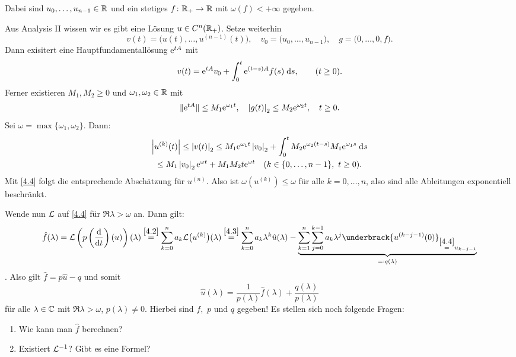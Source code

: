 \documentclass[a4paper,twoside,DIV15,BCOR12mm]{scrbook}
\begin{document}
Dabei sind $u_0,\dotsc,u_{n-1}\in\mathbb{R}$ und ein stetiges $f\colon\mathbb{R}_+\to\mathbb{R}$ mit $\omega(f)<+\infty$ gegeben.

Aus Analysis II wissen wir es gibt eine Lösung $u\in C^n(\mathbb{R}_+)$. Setze weiterhin
\[v(t)=\bigl(u(t),\dotsc,u^{(n-1)}(t)\bigr),\quad v_0=\bigl(u_0,\dotsc,u_{n-1}\bigr),\quad g=\bigl(0,\dotsc,0,f\bigr).\]
Dann exisitert eine Hauptfundamentallösung $\mathrm{e}^{tA}$ mit
\[v(t) = \mathrm{e}^{tA}v_0+\int_{0}^{t}{\mathrm{e}^{(t-s)A}f(s)}\;\mathrm{d} s,\qquad(t\geq0).\]
Ferner existieren $M_1,M_2\geq 0$ und $\omega_1,\omega_2\in\mathbb{R}$ mit
\[\|\mathrm{e}^{tA}\|\leq M_1\mathrm{e}^{\omega_1 t},\quad\left\lvert g(t)\right\lvert_2\leq M_2\mathrm{e}^{\omega_2t},\quad t\geq0.\]
Sei $\omega = \max\{\omega_1,\omega_2\}$. Dann:
\begin{multline*}
\left\lvert u^{(k)}(t)\right\lvert\leq\left\lvert v(t)\right\lvert_2\leq M_1\mathrm{e}^{\omega_1t}\left\lvert v_0\right\lvert_2+\int_{0}^{t}{M_2\mathrm{e}^{\omega_2(t-s)}M_1\mathrm{e}^{\omega_1s}}\;\mathrm{d} s\\
\leq M_1\left\lvert v_0\right\lvert_2\mathrm{e}^{\omega t}+M_1M_2t\mathrm{e}^{\omega t}\quad(k\in\{0,\dotsc,n-1\},\ t\geq0).
\end{multline*}
Mit \eqref{4.4} folgt die entsprechende Abschätzung für $u^{(n)}$. Also ist $\omega(u^{(k)})\leq\omega$ für alle $k=0,\dotsc,n$, also sind alle Ableitungen exponentiell beschränkt.

Wende nun $\mathcal{L}$ auf \eqref{4.4} für $\Re{\lambda}>\omega$ an. Dann gilt:
\[\hat{f}(\lambda) = \L\left(p\left(\frac{\d}{\d t}\right)(u)\right)(\lambda)\overset{\eqref{4.2}}{=}\sum_{k=0}^na_k\L\bigl(u^{(k)}\bigr)(\lambda)
\overset{\eqref{4.3}}{=} \sum_{k=0}^na_k\lambda^k\hat{u}(\lambda) - \underbrace{\sum_{k=1}^n\sum_{j=0}^{k-1}a_k\lambda^j\underbrack{u^{(k-j-1)}(0)}_{\overset{\eqref{4.4}}{=}u_{k-j-1}}}_{\ad q(\lambda)}\].
Also gilt $\hat{f} = p\hat{u} - q$ und somit
\begin{equation}\label{4.5}
\hat{u}(\lambda) = \frac{1}{p(\lambda)}\hat{f}(\lambda) + \frac{q(\lambda)}{p(\lambda)}
\end{equation}
für alle $\lambda\in\mathbb{C}$ mit $\Re{\lambda}>\omega$, $p(\lambda)\neq 0$. Hierbei sind $f,$ $p$ und $q$ gegeben!
Es stellen sich noch folgende Fragen:
\begin{enumerate}[label=\arabic*)]
\item Wie kann man $\hat{f}$ berechnen?
\item Existiert $\mathcal{L}^{-1}$? Gibt es eine Formel?
\end{enumerate}
\end{document}
